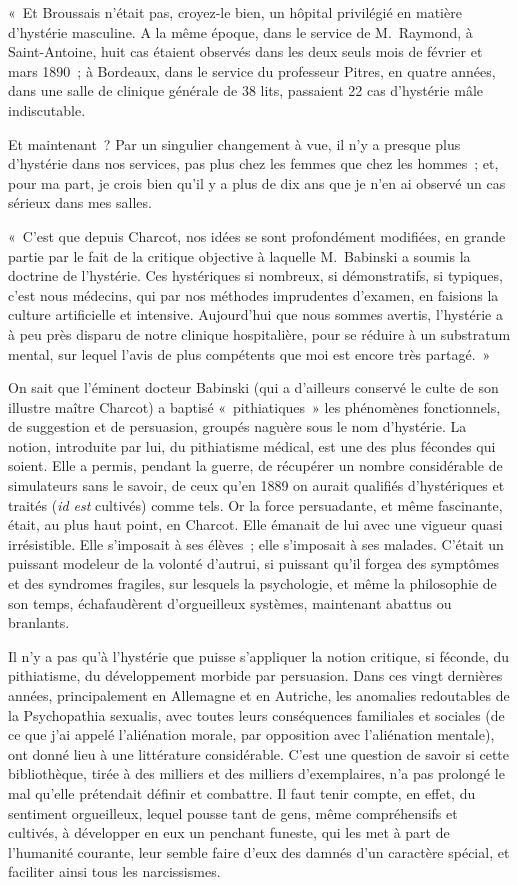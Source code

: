 \documentclass[french,twoside]{book} %
\begin{document}
« Et Broussais n’était pas, croyez-le bien, un hôpital privilégié en matière d’hystérie masculine. A la même époque, dans le service de M. Raymond, à Saint-Antoine, huit cas étaient observés dans les deux seuls mois de février et mars 1890 ; à Bordeaux, dans le service du professeur Pitres, en quatre années, dans une salle de clinique générale de 38 lits, passaient 22 cas d’hystérie mâle indiscutable.\par
Et maintenant ? Par un singulier changement à vue, il n’y a presque plus d’hystérie dans nos services, pas plus chez les femmes que chez les hommes ; et, pour ma part, je crois bien qu’il y a plus de dix ans que je n’en ai observé un cas sérieux dans mes salles.\par
« C’est que depuis Charcot, nos idées se sont profondément modifiées, en grande partie par le fait de la critique objective à laquelle M. Babinski a soumis la doctrine de l’hystérie. Ces hystériques si nombreux, si démonstratifs, si typiques, c’est nous médecins, qui par nos méthodes imprudentes d’examen, en faisions la culture artificielle et intensive. Aujourd’hui que nous sommes avertis, l’hystérie a à peu près disparu de notre clinique hospitalière, pour se réduire à un substratum mental, sur lequel l’avis de plus compétents que moi est encore très partagé. »\par
On sait que l’éminent docteur Babinski (qui a d’ailleurs conservé le culte de son illustre maître Charcot) a baptisé « pithiatiques » les phénomènes fonctionnels, de suggestion et de persuasion, groupés naguère sous le nom d’hystérie. La notion, introduite par lui, du pithiatisme médical, est une des plus fécondes qui soient. Elle a permis, pendant la guerre, de récupérer un nombre considérable de simulateurs sans le savoir, de ceux qu’en 1889 on aurait qualifiés d’hystériques et traités ({\itshape id est} cultivés) comme tels. Or la force persuadante, et même fascinante, était, au plus haut point, en Charcot. Elle émanait de lui avec une vigueur quasi irrésistible. Elle s’imposait à ses élèves ; elle s’imposait à ses malades. C’était un puissant modeleur de la volonté d’autrui, si puissant qu’il forgea des symptômes et des syndromes fragiles, sur lesquels la psychologie, et même la philosophie de son temps, échafaudèrent d’orgueilleux systèmes, maintenant abattus ou branlants.\par
Il n’y a pas qu’à l’hystérie que puisse s’appliquer la notion critique, si féconde, du pithiatisme, du développement morbide par persuasion. Dans ces vingt dernières années, principalement en Allemagne et en Autriche, les anomalies redoutables de la Psychopathia sexualis, avec toutes leurs conséquences familiales et sociales (de ce que j’ai appelé l’aliénation morale, par opposition avec l’aliénation mentale), ont donné lieu à une littérature considérable. C’est une question de savoir si cette bibliothèque, tirée à des milliers et des milliers d’exemplaires, n’a pas prolongé le mal qu’elle prétendait définir et combattre. Il faut tenir compte, en effet, du sentiment orgueilleux, lequel pousse tant de gens, même compréhensifs et cultivés, à développer en eux un penchant funeste, qui les met à part de l’humanité courante, leur semble faire d’eux des damnés d’un caractère spécial, et faciliter ainsi tous les narcissismes.\par
\end{document}
